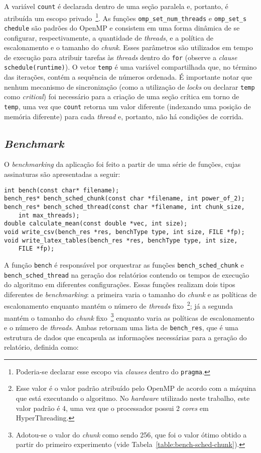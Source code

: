 \documentclass[12pt,a4paper]{article}
\begin{document}
A variável \texttt{count} é declarada dentro de uma seção paralela e, portanto,
é atribuída um escopo privado~\footnote{Poderia-se declarar esse escopo via
\textit{clauses} dentro do \texttt{pragma}.}. As funções
\texttt{omp\_set\_num\_threads} e \texttt{omp\_set\_s\\chedule} são padrões do
OpenMP e consistem em uma forma dinâmica de se configurar, respectivamente, a
quantidade de \textit{threads}, e a política de escalonamento e o tamanho do
\textit{chunk}. Esses parâmetros são utilizados em tempo de execução para
atribuir tarefas às \textit{threads} dentro do \texttt{for} (observe a
\textit{clause} \texttt{schedule(runtime)}). O vetor \texttt{temp} é uma
variável compartilhada que, no término das iterações, contém a sequência de
números ordenada. É importante notar que nenhum mecanismo de sincronização (como
a utilização de \textit{locks} ou declarar \texttt{temp} como \emph{critical})
foi necessário para a criação de uma seção crítica em torno de \texttt{temp},
uma vez que \texttt{count} retorna um valor diferente (indexando uma posição de
memória diferente) para cada \textit{thread} e, portanto, não há condições de
corrida.


\subsection{\textit{Benchmark}}
O \textit{benchmarking} da aplicação foi feito a partir de uma série de funções,
cujas assinaturas são apresentadas a seguir:

\begin{verbatim}
int bench(const char* filename);
bench_res* bench_sched_chunk(const char *filename, int power_of_2);
bench_res* bench_sched_thread(const char *filename, int chunk_size,
    int max_threads);
double calculate_mean(const double *vec, int size);
void write_csv(bench_res *res, benchType type, int size, FILE *fp);
void write_latex_tables(bench_res *res, benchType type, int size,
    FILE *fp);
\end{verbatim}

A função \texttt{bench} é responsável por orquestrar as funções
\texttt{bench\_sched\_chunk} e \texttt{bench\_sched\_thread} na geração dos
relatórios contendo os tempos de execução do algoritmo em diferentes
configurações. Essas funções realizam dois tipos diferentes de
\textit{benchmarking}: a primeira varia o tamanho do \textit{chunk} e as
políticas de escalonamento enquanto mantém o número de \textit{threads}
fixo~\footnote{Esse valor é o valor padrão atribuído pelo OpenMP de acordo com a
máquina que está executando o algoritmo. No \textit{hardware} utilizado neste
trabalho, este valor padrão é 4, uma vez que o processador possui 2
\textit{cores} em HyperThreading.}; já a segunda mantém o tamanho do
\textit{chunk} fixo~\footnote{Adotou-se o valor do \textit{chunk} como sendo
256, que foi o valor ótimo obtido a partir do primeiro experimento (vide
Tabela~\ref{table:bench-sched-chunk}).} enquanto varia as políticas de
escalonamento e o número de \textit{threads}. Ambas retornam uma lista de
\texttt{bench\_res}, que é uma estrutura de dados que encapsula as informações
necessárias para a geração do relatório, definida como:
\end{document}
